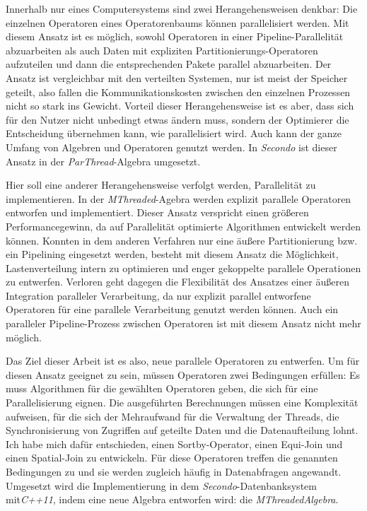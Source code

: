 \documentclass[a4paper,12pt,twoside]{article}
\newcommand{\Fb}[1]{\textit{#1}} %
\begin{document}
Innerhalb nur eines Computersystems sind zwei Herangehensweisen denkbar: Die einzelnen Operatoren eines Operatorenbaums können parallelisiert werden. Mit diesem Ansatz ist es möglich, sowohl Operatoren in einer Pipeline-Parallelität abzuarbeiten als auch Daten mit expliziten Partitionierungs-Operatoren aufzuteilen und dann die entsprechenden Pakete parallel abzuarbeiten. Der Ansatz ist vergleichbar mit den verteilten Systemen, nur ist meist der Speicher geteilt, also fallen die Kommunikationskosten zwischen den einzelnen Prozessen nicht so stark ins Gewicht. Vorteil dieser Herangehensweise ist es aber, dass sich für den Nutzer nicht unbedingt etwas ändern muss, sondern der Optimierer die Entscheidung übernehmen kann, wie parallelisiert wird. Auch kann der ganze Umfang von Algebren und Operatoren genutzt werden. In \Fb{Secondo} ist dieser Ansatz in der \Fb{ParThread}-Algebra umgesetzt.

Hier soll eine anderer Herangehensweise verfolgt werden, Parallelität zu implementieren. In der \Fb{MThreaded}-Agebra werden explizit parallele Operatoren entworfen und implementiert. Dieser Ansatz verspricht einen größeren Performancegewinn, da auf Parallelität optimierte Algorithmen entwickelt werden können. Konnten in dem anderen Verfahren nur eine äußere Partitionierung bzw. ein Pipelining eingesetzt werden, besteht mit diesem Ansatz die Möglichkeit, Lastenverteilung intern zu optimieren und enger gekoppelte parallele Operationen zu entwerfen. Verloren geht dagegen die Flexibilität des Ansatzes einer äußeren Integration paralleler Verarbeitung, da nur explizit parallel entworfene Operatoren für eine parallele Verarbeitung genutzt werden können. Auch ein paralleler Pipeline-Prozess zwischen Operatoren ist mit diesem Ansatz nicht mehr möglich.

Das Ziel dieser Arbeit ist es also, neue parallele Operatoren zu entwerfen. Um für diesen Ansatz geeignet zu sein, müssen Operatoren zwei Bedingungen erfüllen: Es muss Algorithmen für die gewählten Operatoren geben, die sich für eine Parallelisierung eignen. Die ausgeführten Berechnungen müssen eine Komplexität aufweisen, für die sich der Mehraufwand für die Verwaltung der Threads, die Synchronisierung von Zugriffen auf geteilte Daten und die Datenaufteilung lohnt. Ich habe mich dafür entschieden, einen Sortby-Operator, einen Equi-Join und einen Spatial-Join zu entwickeln. Für diese Operatoren treffen die genannten Bedingungen zu und sie werden zugleich häufig in Datenabfragen angewandt. Umgesetzt wird die Implementierung in dem \Fb{Secondo}-Datenbanksystem mit\Fb{C++11}, indem eine neue Algebra entworfen wird: die \Fb{MThreadedAlgebra}. 
\end{document}

